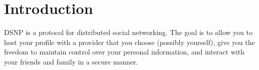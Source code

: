 \documentclass[letterpaper,11pt,oneside]{article}
\begin{document}
\newpage

\tableofcontents

%
%


%
%
%


\section{Introduction}

%
%
%
%
% 


DSNP is a protocol for distributed social networking. The goal is to allow you
to host your profile with a provider that you choose (possibly yourself), give
you the freedom to maintain control over your personal information, and
interact with your friends and family in a secure manner.
\end{document}
